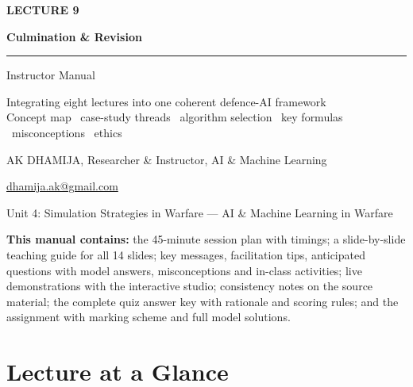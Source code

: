 \documentclass[11pt]{article}
\begin{document}
\begin{titlepage}\centering\vspace*{2.2cm}
{\color{AccN}\large\bfseries LECTURE 9\par}\vspace{0.6cm}
{\color{NavyN}\Huge\bfseries Culmination \& Revision\par}\vspace{0.6cm}
{\color{AccN}\rule{0.7\textwidth}{1.5pt}}\par\vspace{0.6cm}
{\LARGE Instructor Manual\par}\vspace{0.4cm}
{\large\begin{minipage}{0.85\textwidth}\centering Integrating eight lectures into one coherent defence-AI framework\\Concept map \textbullet\ case-study threads \textbullet\ algorithm selection \textbullet\ key formulas \textbullet\ misconceptions \textbullet\ ethics\end{minipage}\par}\vspace{2cm}
{\large AK DHAMIJA, Researcher \& Instructor, AI \& Machine Learning\par}\vspace{0.2cm}
{\normalsize \href{mailto:dhamija.ak@gmail.com}{dhamija.ak@gmail.com} \quad\textbullet{}\par}\vspace{0.3cm}
{Unit 4: Simulation Strategies in Warfare --- AI \& Machine Learning in Warfare\par}\vfill
\begin{tcolorbox}[colback=NavyN!4,colframe=NavyN,boxrule=0.6pt,arc=2pt,width=0.9\textwidth]\small
\textbf{This manual contains:} the 45-minute session plan with timings; a slide-by-slide teaching guide for all 14 slides; key messages, facilitation tips, anticipated questions with model answers, misconceptions and in-class activities; live demonstrations with the interactive studio; consistency notes on the source material; the complete quiz answer key with rationale and scoring rules; and the assignment with marking scheme and full model solutions.
\end{tcolorbox}
\end{titlepage}
\tableofcontents\newpage


\section{Lecture at a Glance}
\end{document}
